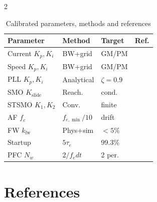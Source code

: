\documentclass[10pt,twoside,a4paper]{article}
\begin{document}
\begin{multicols}{2}
\begin{table}[htbp]
  \centering\footnotesize
  \caption{Calibrated parameters, methods and references}
  \begin{tabular}{@{}p{1.6cm}p{1.7cm}p{1.2cm}c@{}}
    \toprule
    Parameter & Method & Target & Ref.\\
    \midrule
    Current $K_p,K_i$ & BW+grid & GM/PM & \cite{astrom2006,franklin2019}\\
    Speed $K_p,K_i$   & BW+grid & GM/PM & \cite{astrom2006,kazmierkowski2002}\\
    PLL $K_p,K_i$     & Analytical & $\zeta{=}0.9$ & \cite{chen2000,widrow1985}\\
    SMO $K_\text{slide}$ & Reach. & cond. & \cite{lascu2000,utkin2009}\\
    STSMO $K_1,K_2$   & Conv. & finite & \cite{levant2007,laghrouche2007}\\
    AF $f_c$          & $f_{e,\min}/10$ & drift & \cite{boldea2008,piippo2009}\\
    FW $k_\text{fw}$  & Phys+sim & $<5\%$ & \cite{jahns1986,rahman1998}\\
    Startup           & $5\tau_e$ & 99.3\% & \cite{giri2013,holtz2002}\\
    PFC $N_w$         & $2/f_e dt$ & 2 per. & \cite{green2005,akagi2007}\\
    \bottomrule
  \end{tabular}
\end{table}

\end{multicols}

\newpage
\section*{References}
\end{document}

